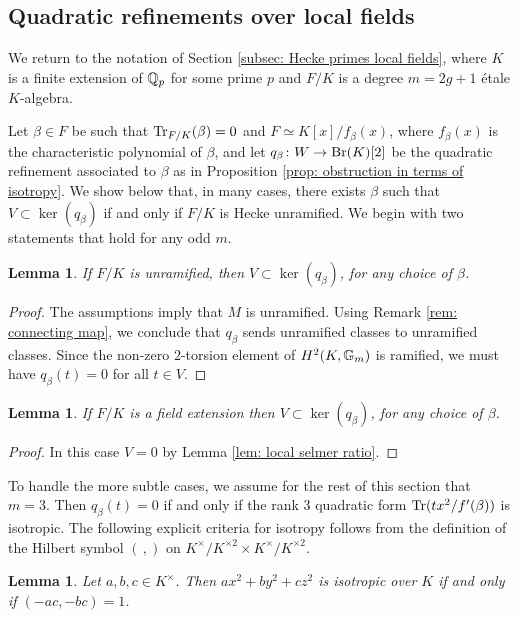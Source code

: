 \documentclass[11pt,a4paper]{amsart}
\def\Q{{\rm \mathbb{Q}}}
\def\G{{\rm \mathbb{G}}}
\def\Tr{{\rm Tr}}
\def\Br{{\rm Br}}
\numberwithin{equation}{section}
\newtheorem{lemma}[theorem]{Lemma}
\begin{document}
\subsection{Quadratic refinements over local fields}\label{subsec: quadratic refinements over local fields}
We return to the notation of Section \ref{subsec: Hecke primes local fields}, where $K$ is a finite extension of $\Q_p$ for some prime $p$ and $F/K$ is a degree $m = 2g+1$ \'etale $K$-algebra.


Let $\beta \in F$ be such that $\Tr_{F/K}(\beta) = 0$ and $F \simeq K[x]/f_\beta(x)$, where $f_\beta(x)$ is the characteristic polynomial of $\beta$, and let $q_\beta\colon W \to \Br(K)[2]$ be the quadratic refinement associated to $\beta$ as in Proposition \ref{prop: obstruction in terms of isotropy}. We show below that, in many cases, there exists $\beta$ such that $V \subset \ker(q_\beta)$ if and only if $F/K$ is Hecke unramified.  We begin with two statements that hold for any odd $m$. 

\begin{lemma}\label{lem: locally unobstructed at unramified primes}
    If $F/K$ is unramified, then $V\subset \ker(q_\beta)$, for any choice of $\beta$. 
\end{lemma}
\begin{proof}
    The assumptions imply that $M$ is unramified. Using Remark \ref{rem: connecting map},  we conclude that $q_\beta$ sends unramified classes to unramified classes. Since the non-zero $2$-torsion element of $H^2(K, \G_m)$ is ramified, we must have $q_\beta(t) = 0$ for all $t \in V$.
\end{proof}

\begin{lemma}\label{lem: field extensions}
    If $F/K$ is a field extension then $V\subset \ker(q_\beta)$, for any choice of $\beta$.
\end{lemma}
\begin{proof}
    In this case $V = 0$ by Lemma \ref{lem: local selmer ratio}. \end{proof}



To handle the more subtle cases, we assume for the rest of this section that $m = 3$. Then $q_\beta(t) = 0$ if and only if the rank $3$ quadratic form $\Tr(tx^2/f'(\beta))$ is isotropic. The following explicit criteria for isotropy follows from the definition of the Hilbert symbol $( \, , )$ on $K^\times/K^{\times 2} \times K^\times/K^{\times 2}$. 

\begin{lemma}\label{lem: isotropy criterion}
    Let $a,b,c \in K^\times$. Then $ax^2 + by^2 + cz^2$ is isotropic over $K$ if and only if $(-ac,-bc)= 1$. 
\end{lemma}
\end{document}
